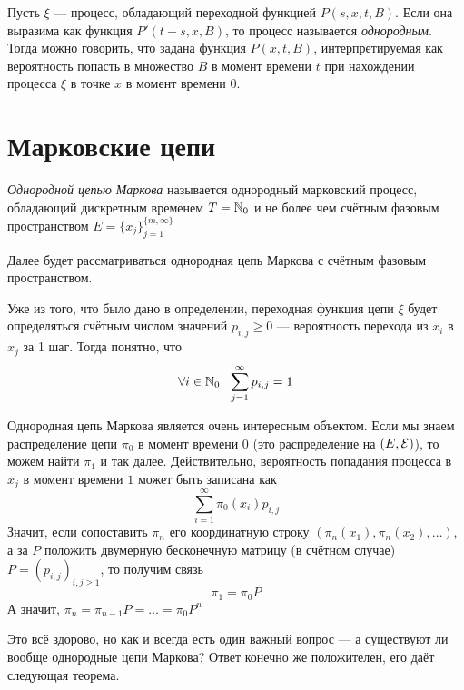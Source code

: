 \begin{definition}
	Пусть $\xi$ --- процесс, обладающий переходной функцией $P(s, x, t, B)$. Если она выразима как функция $P'(t - s, x, B)$, то процесс называется \textit{однородным}. Тогда можно говорить, что задана функция $P(x, t, B)$, интерпретируемая как вероятность попасть в множество $B$ в момент времени $t$ при нахождении процесса $\xi$ в точке $x$ в момент времени $0$.
\end{definition}

\section{Марковские цепи}

\begin{definition}
	\textit{Однородной цепью Маркова} называется однородный марковский процесс, обладающий дискретным временем $T = \mathbb{N}_0$ и не более чем счётным фазовым пространством $E = \{x_j\}_{j = 1}^{\{m, \infty\}}$
\end{definition}

\begin{note}
	Далее будет рассматриваться однородная цепь Маркова с счётным фазовым пространством.
\end{note}

\begin{note}
	Уже из того, что было дано в определении, переходная функция цепи $\xi$ будет определяться счётным числом значений $p_{i, j} \ge 0$ --- вероятность перехода из $x_i$ в $x_j$ за 1 шаг. Тогда понятно, что
	\[
		\forall i \in \mathbb{N}_0\ \ \sum_{j = 1}^\infty p_{i, j} = 1
	\]
\end{note}

\begin{note}
	Однородная цепь Маркова является очень интересным объектом. Если мы знаем распределение цепи $\pi_0$ в момент времени $0$ (это распределение на $(E, \mathcal{E})$), то можем найти $\pi_1$ и так далее. Действительно, вероятность попадания процесса в $x_j$ в момент времени $1$ может быть записана как
	\[
		\sum_{i = 1}^\infty \pi_0(x_i)p_{i, j}
	\]
	Значит, если сопоставить $\pi_n$ его координатную строку $(\pi_n(x_1), \pi_n(x_2), \ldots)$, а за $P$ положить двумерную бесконечную матрицу (в счётном случае) $P = (p_{i, j})_{i, j \ge 1}$, то получим связь
	\[
		\pi_1 = \pi_0P
	\]
	А значит, $\pi_n = \pi_{n - 1}P = \ldots = \pi_0P^n$
\end{note}

\begin{note}
	Это всё здорово, но как и всегда есть один важный вопрос --- а существуют ли вообще однородные цепи Маркова? Ответ конечно же положителен, его даёт следующая теорема.
\end{note}

